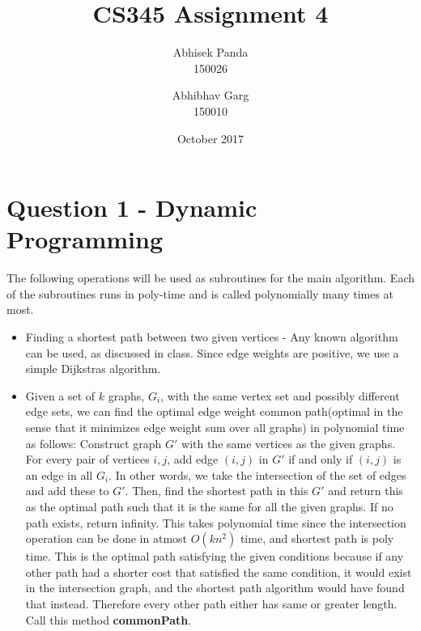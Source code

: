 \documentclass{article}
\title{CS345 Assignment 4}
\author{Abhisek Panda \\ 150026 \and Abhibhav Garg \\ 150010}
\date{October 2017}
\begin{document}
\maketitle

\section{Question 1 - Dynamic Programming}
The following operations will be used as subroutines for the main algorithm.
Each of the subroutines runs in poly-time and is called polynomially many times at most.
\begin{itemize}
    \item Finding a shortest path between two given vertices - Any known algorithm can be used, as discussed in class. Since edge weights are positive, we use a simple Dijkstras algorithm.
    \item Given a set of $k$ graphs, $G_{i}$, with the same vertex set and possibly different edge sets, we can find the optimal edge weight common path(optimal in the sense that it minimizes edge weight sum over all graphs) in polynomial time as follows: Construct graph $G'$ with the same vertices as the given graphs. For every pair of vertices $i, j$, add edge $(i, j)$ in $G'$ if and only if $(i, j)$ is an edge in all $G_{i}$. In other words, we take the intersection of the set of edges and add these to $G'$. Then, find the shortest path in this $G'$ and return this as the optimal path such that it is the same for all the given graphs. If no path exists, return infinity.
    This takes polynomial time since the intersection operation can be done in atmost $O(kn^2)$ time, and shortest path is poly time.
    This is the optimal path satisfying the given conditions because if any other path had a shorter cost that satisfied the same condition, it would exist in the intersection graph, and the shortest path algorithm would have found that instead. Therefore every other path either has same or greater length. Call this method \textbf{commonPath}.
\end{itemize}
\end{document}
